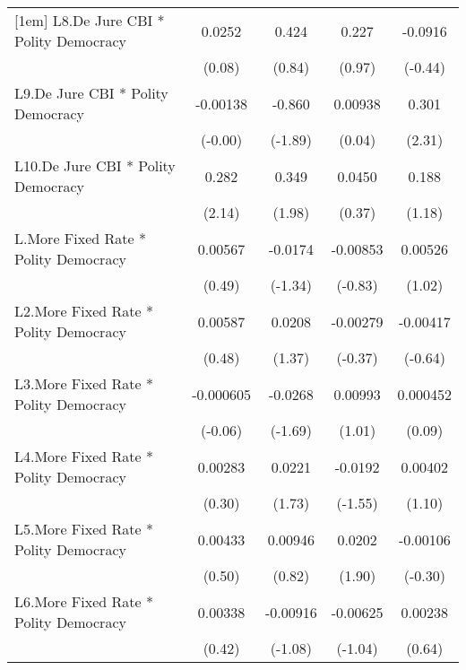 {\begin{tabular}{l*{4}{c}}
[1em]
L8.De Jure CBI * Polity Democracy&   0.0252         &    0.424         &    0.227         &  -0.0916         \\
                &   (0.08)         &   (0.84)         &   (0.97)         &  (-0.44)         \\
[1em]
L9.De Jure CBI * Polity Democracy& -0.00138         &   -0.860         &  0.00938         &    0.301\sym{*}  \\
                &  (-0.00)         &  (-1.89)         &   (0.04)         &   (2.31)         \\
[1em]
L10.De Jure CBI * Polity Democracy&    0.282\sym{*}  &    0.349\sym{*}  &   0.0450         &    0.188         \\
                &   (2.14)         &   (1.98)         &   (0.37)         &   (1.18)         \\
[1em]
L.More Fixed Rate * Polity Democracy&  0.00567         &  -0.0174         & -0.00853         &  0.00526         \\
                &   (0.49)         &  (-1.34)         &  (-0.83)         &   (1.02)         \\
[1em]
L2.More Fixed Rate * Polity Democracy&  0.00587         &   0.0208         & -0.00279         & -0.00417         \\
                &   (0.48)         &   (1.37)         &  (-0.37)         &  (-0.64)         \\
[1em]
L3.More Fixed Rate * Polity Democracy&-0.000605         &  -0.0268         &  0.00993         & 0.000452         \\
                &  (-0.06)         &  (-1.69)         &   (1.01)         &   (0.09)         \\
[1em]
L4.More Fixed Rate * Polity Democracy&  0.00283         &   0.0221         &  -0.0192         &  0.00402         \\
                &   (0.30)         &   (1.73)         &  (-1.55)         &   (1.10)         \\
[1em]
L5.More Fixed Rate * Polity Democracy&  0.00433         &  0.00946         &   0.0202         & -0.00106         \\
                &   (0.50)         &   (0.82)         &   (1.90)         &  (-0.30)         \\
[1em]
L6.More Fixed Rate * Polity Democracy&  0.00338         & -0.00916         & -0.00625         &  0.00238         \\
                &   (0.42)         &  (-1.08)         &  (-1.04)         &   (0.64)         \\

\end{tabular}}
